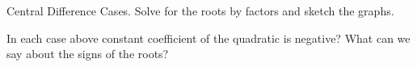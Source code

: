 \documentclass[12pt, a4paper, addpoints]{exam}
\begin{document}
\begin{questions}
\question Central Difference Cases. Solve for the roots by factors  and sketch the graphs. 
\setlength{\columnsep}{20pt}
\begin{multicols}{3}
\end{multicols}
\question In each case above constant coefficient of the quadratic is negative? What can we say about the signs of the roots?
\newpage



\end{questions}
\end{document}
